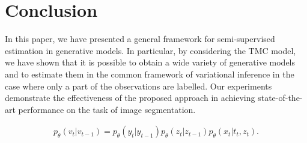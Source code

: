 \documentclass{article}
\def\p{p_{\theta}}
\begin{document}
\section{Conclusion}
\label{sec:conclusion}
In this paper, we have presented a general 
framework for semi-supervised estimation in generative
models. In particular, by considering the TMC model, we have shown that it is possible
to obtain a wide variety of generative models and
to estimate them in the common framework of
variational inference in the case where only
a part of the observations are labelled.
Our experiments demonstrate the effectiveness of the proposed approach in achieving state-of-the-art performance on the task of image segmentation.












\newpage
\begin{align}
   \label{eq:TMC1}
   \p(v_t|v_{t-1}) \!= \!\p(y_t|y_{t-1}) \p(z_t|z_{t-1}) \p(x_t|t_t,z_t) \text{.}
\end{align}
\end{document}
